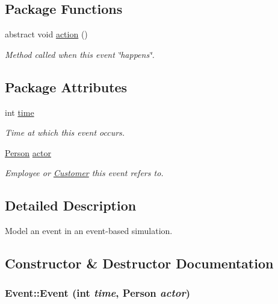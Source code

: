 \subsection*{Package Functions}
\begin{CompactItemize}
\item 
abstract void \hyperlink{class_event_fea360b9a95713e43cf3f9fa44150074}{action} ()
\begin{CompactList}\small\item\em Method called when this event \char`\"{}happens\char`\"{}. \item\end{CompactList}\end{CompactItemize}
\subsection*{Package Attributes}
\begin{CompactItemize}
\item 
\hypertarget{class_event_d4c0fbb00c3fd993405df98bafcd52c5}{
int \hyperlink{class_event_d4c0fbb00c3fd993405df98bafcd52c5}{time}}
\label{class_event_d4c0fbb00c3fd993405df98bafcd52c5}

\begin{CompactList}\small\item\em Time at which this event occurs. \item\end{CompactList}\item 
\hypertarget{class_event_28f906bdfa717a32d605aedde772d530}{
\hyperlink{class_person}{Person} \hyperlink{class_event_28f906bdfa717a32d605aedde772d530}{actor}}
\label{class_event_28f906bdfa717a32d605aedde772d530}

\begin{CompactList}\small\item\em Employee or \hyperlink{class_customer}{Customer} this event refers to. \item\end{CompactList}\end{CompactItemize}


\subsection{Detailed Description}
Model an event in an event-based simulation. 

\subsection{Constructor \& Destructor Documentation}
\hypertarget{class_event_2561c2efeea27bff2bbda6c6dd33aea3}{
\subsubsection[{Event}]{\setlength{\rightskip}{0pt plus 5cm}Event::Event (int {\em time}, \/  {\bf Person} {\em actor})}}
\label{class_event_2561c2efeea27bff2bbda6c6dd33aea3}


